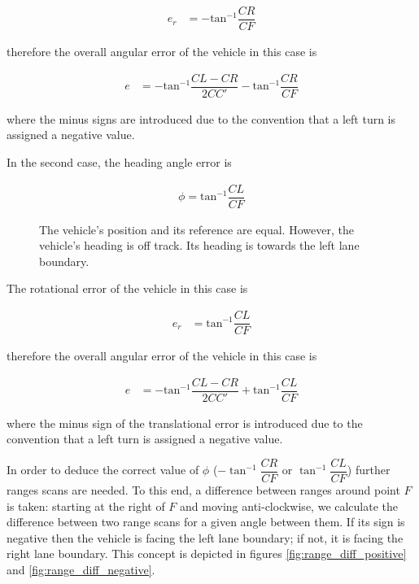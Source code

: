 \documentclass[oneside,12pt]{article}
\begin{document}
    \begin{align}
      e_r &= -\text{tan}^{-1}\dfrac{CR}{CF}
    \end{align}

    therefore the overall angular error of the vehicle in this case is

    \begin{align}
      e &= -\text{tan}^{-1}\dfrac{CL-CR}{2CC'} - \text{tan}^{-1}\dfrac{CR}{CF}
    \end{align}

    where the minus signs are introduced due to the
    convention that a left turn is assigned a negative value.


    In the second case, the heading angle error is

    \begin{align}
      \phi = \text{tan}^{-1}\dfrac{CL}{CF}
    \end{align}

    \begin{figure}[H]\centering
      \scalebox{1}{}
      \caption{The vehicle's position and its reference are equal. However,
        the vehicle's heading is off track. Its heading is towards the left
        lane boundary.}
      \label{}
    \end{figure}

    The rotational error of the vehicle in this case is

    \begin{align}
      e_r &= \text{tan}^{-1}\dfrac{CL}{CF}
    \end{align}

    therefore the overall angular error of the vehicle in this case is

    \begin{align}
      e &= -\text{tan}^{-1}\dfrac{CL-CR}{2CC'} + \text{tan}^{-1}\dfrac{CL}{CF}
    \end{align}

    where the minus sign of the translational error is introduced due to the
    convention that a left turn is assigned a negative value.


    In order to deduce the correct value of $\phi$ ($-\tan^{-1}\dfrac{CR}{CF}$ or
    $\tan^{-1}\dfrac{CL}{CF}$) further ranges scans are needed. To this end,
    a difference between ranges around point $F$ is taken: starting at the
    right of $F$ and moving anti-clockwise, we calculate the difference between
    two range scans for a given angle between them. If its sign
    is negative then the vehicle is facing the left lane boundary; if not,
    it is facing the right lane boundary. This concept is depicted in figures
    \ref{fig:range_diff_positive} and  \ref{fig:range_diff_negative}.
\end{document}
